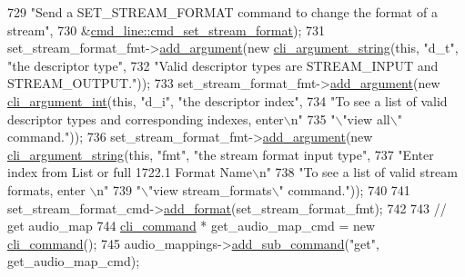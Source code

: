 \begin{DoxyCode}
729         \textcolor{stringliteral}{"Send a SET\_STREAM\_FORMAT command to change the format of a stream"},
730         &\hyperlink{classcmd__line_ac12fbbb5159e345869b53aeade846957}{cmd\_line::cmd\_set\_stream\_format});
731     set\_stream\_format\_fmt->\hyperlink{classcli__command__format_ac3fc6d13a227c195d5ee6f7b78eba9cd}{add\_argument}(\textcolor{keyword}{new} \hyperlink{classcli__argument__string}{cli\_argument\_string}(\textcolor{keyword}{this}, \textcolor{stringliteral}{"d\_t"},
       \textcolor{stringliteral}{"the descriptor type"},
732                                                                 \textcolor{stringliteral}{"Valid descriptor types are STREAM\_INPUT
       and STREAM\_OUTPUT."}));
733     set\_stream\_format\_fmt->\hyperlink{classcli__command__format_ac3fc6d13a227c195d5ee6f7b78eba9cd}{add\_argument}(\textcolor{keyword}{new} \hyperlink{classcli__argument__int}{cli\_argument\_int}(\textcolor{keyword}{this}, \textcolor{stringliteral}{"d\_i"}, \textcolor{stringliteral}{"the
       descriptor index"},
734                                                              \textcolor{stringliteral}{"To see a list of valid descriptor types and
       corresponding indexes, enter\(\backslash\)n"}
735                                                              \textcolor{stringliteral}{"\(\backslash\)"view all\(\backslash\)" command."}));
736     set\_stream\_format\_fmt->\hyperlink{classcli__command__format_ac3fc6d13a227c195d5ee6f7b78eba9cd}{add\_argument}(\textcolor{keyword}{new} \hyperlink{classcli__argument__string}{cli\_argument\_string}(\textcolor{keyword}{this}, \textcolor{stringliteral}{"fmt"},
       \textcolor{stringliteral}{"the stream format input type"},
737                                                                 \textcolor{stringliteral}{"Enter index from List or full 1722.1
       Format Name\(\backslash\)n"}
738                                                                 \textcolor{stringliteral}{"To see a list of valid stream formats,
       enter \(\backslash\)n"}
739                                                                 \textcolor{stringliteral}{"\(\backslash\)"view stream\_formats\(\backslash\)" command."}));
740 
741     set\_stream\_format\_cmd->\hyperlink{classcli__command_aa9ec38e761644d946f8db2b920e39921}{add\_format}(set\_stream\_format\_fmt);
742 
743     \textcolor{comment}{// get audio\_map}
744     \hyperlink{classcli__command}{cli\_command} * get\_audio\_map\_cmd = \textcolor{keyword}{new} \hyperlink{classcli__command}{cli\_command}();
745     audio\_mappings->\hyperlink{classcli__command_aa73a67e8ebb6facd4b40ced66279b226}{add\_sub\_command}(\textcolor{stringliteral}{"get"}, get\_audio\_map\_cmd);

\end{DoxyCode}

